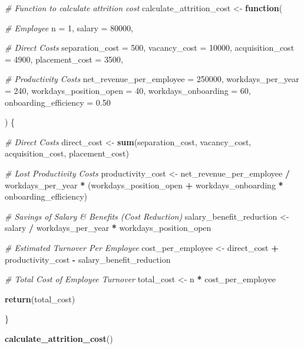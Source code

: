 \documentclass[
]{article}
\newenvironment{Shaded}{\begin{snugshade}}{\end{snugshade}}
\newcommand{\CommentTok}[1]{\textcolor[rgb]{0.56,0.35,0.01}{\textit{#1}}}
\newcommand{\ControlFlowTok}[1]{\textcolor[rgb]{0.13,0.29,0.53}{\textbf{#1}}}
\newcommand{\DataTypeTok}[1]{\textcolor[rgb]{0.13,0.29,0.53}{#1}}
\newcommand{\DecValTok}[1]{\textcolor[rgb]{0.00,0.00,0.81}{#1}}
\newcommand{\FloatTok}[1]{\textcolor[rgb]{0.00,0.00,0.81}{#1}}
\newcommand{\KeywordTok}[1]{\textcolor[rgb]{0.13,0.29,0.53}{\textbf{#1}}}
\newcommand{\NormalTok}[1]{#1}
\newcommand{\OperatorTok}[1]{\textcolor[rgb]{0.81,0.36,0.00}{\textbf{#1}}}
\newcommand{\StringTok}[1]{\textcolor[rgb]{0.31,0.60,0.02}{#1}}
\begin{document}
\begin{Shaded}
\begin{Highlighting}[]
\CommentTok{# Function to calculate attrition cost}
\NormalTok{calculate_attrition_cost <-}\StringTok{ }\ControlFlowTok{function}\NormalTok{(}

  \CommentTok{# Employee}
  \DataTypeTok{n                    =} \DecValTok{1}\NormalTok{,}
  \DataTypeTok{salary               =} \DecValTok{80000}\NormalTok{,}

  \CommentTok{# Direct Costs}
  \DataTypeTok{separation_cost      =} \DecValTok{500}\NormalTok{,}
  \DataTypeTok{vacancy_cost         =} \DecValTok{10000}\NormalTok{,}
  \DataTypeTok{acquisition_cost     =} \DecValTok{4900}\NormalTok{,}
  \DataTypeTok{placement_cost       =} \DecValTok{3500}\NormalTok{,}

  \CommentTok{# Productivity Costs}
  \DataTypeTok{net_revenue_per_employee =} \DecValTok{250000}\NormalTok{,}
  \DataTypeTok{workdays_per_year        =} \DecValTok{240}\NormalTok{,}
  \DataTypeTok{workdays_position_open   =} \DecValTok{40}\NormalTok{,}
  \DataTypeTok{workdays_onboarding      =} \DecValTok{60}\NormalTok{,}
  \DataTypeTok{onboarding_efficiency    =} \FloatTok{0.50}

\NormalTok{) \{}

  \CommentTok{# Direct Costs}
\NormalTok{  direct_cost <-}\StringTok{ }\KeywordTok{sum}\NormalTok{(separation_cost, vacancy_cost, acquisition_cost, placement_cost)}

  \CommentTok{# Lost Productivity Costs}
\NormalTok{  productivity_cost <-}\StringTok{ }\NormalTok{net_revenue_per_employee }\OperatorTok{/}\StringTok{ }\NormalTok{workdays_per_year }\OperatorTok{*}
\StringTok{    }\NormalTok{(workdays_position_open }\OperatorTok{+}\StringTok{ }\NormalTok{workdays_onboarding }\OperatorTok{*}\StringTok{ }\NormalTok{onboarding_efficiency)}

  \CommentTok{# Savings of Salary & Benefits (Cost Reduction)}
\NormalTok{  salary_benefit_reduction <-}\StringTok{ }\NormalTok{salary }\OperatorTok{/}\StringTok{ }\NormalTok{workdays_per_year }\OperatorTok{*}\StringTok{ }\NormalTok{workdays_position_open}

  \CommentTok{# Estimated Turnover Per Employee}
\NormalTok{  cost_per_employee <-}\StringTok{ }\NormalTok{direct_cost }\OperatorTok{+}\StringTok{ }\NormalTok{productivity_cost }\OperatorTok{-}\StringTok{ }\NormalTok{salary_benefit_reduction}

  \CommentTok{# Total Cost of Employee Turnover}
\NormalTok{  total_cost <-}\StringTok{ }\NormalTok{n }\OperatorTok{*}\StringTok{ }\NormalTok{cost_per_employee}

  \KeywordTok{return}\NormalTok{(total_cost)}

\NormalTok{\}}

\KeywordTok{calculate_attrition_cost}\NormalTok{()}
\end{Highlighting}
\end{Shaded}
\end{document}
